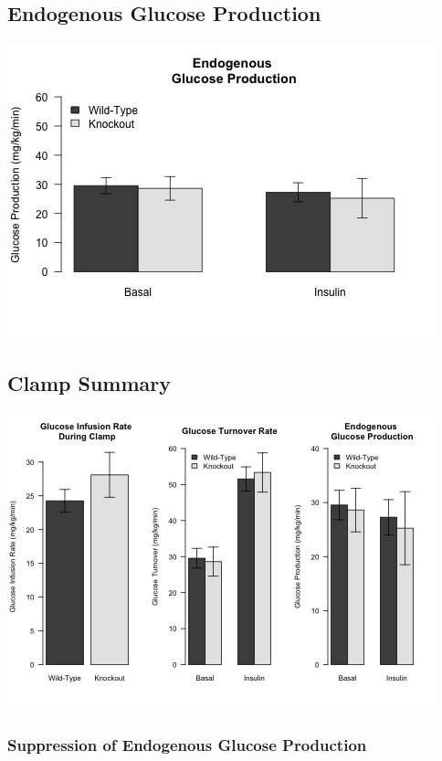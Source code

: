 \documentclass[]{article}
\begin{document}
\subsection{Endogenous Glucose
Production}\label{endogenous-glucose-production}

\includegraphics{figures/glucose-production-1.png}

\subsection{Clamp Summary}\label{clamp-summary}

\includegraphics{figures/clamp-summary-1.png}

\subsubsection{Suppression of Endogenous Glucose
Production}\label{suppression-of-endogenous-glucose-production}
\end{document}
